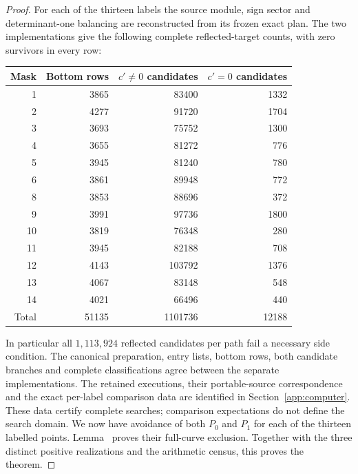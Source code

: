 \begin{proof}
For each of the thirteen labels the source module, sign sector and
determinant-one balancing are reconstructed from its frozen exact plan.
The two implementations give the following complete reflected-target
counts, with zero survivors in every row:
\begin{center}
\begin{tabular}{rrrr}
\toprule
Mask & Bottom rows & $c'\ne0$ candidates & $c'=0$ candidates\\
\midrule
1 & 3865 & 83400 & 1332\\
2 & 4277 & 91720 & 1704\\
3 & 3693 & 75752 & 1300\\
4 & 3655 & 81272 & 776\\
5 & 3945 & 81240 & 780\\
6 & 3861 & 89948 & 772\\
8 & 3853 & 88696 & 372\\
9 & 3991 & 97736 & 1800\\
10 & 3819 & 76348 & 280\\
11 & 3945 & 82188 & 708\\
12 & 4143 & 103792 & 1376\\
13 & 4067 & 83148 & 548\\
14 & 4021 & 66496 & 440\\
\midrule
Total & 51135 & 1101736 & 12188\\
\bottomrule
\end{tabular}
\end{center}
In particular all $1{,}113{,}924$ reflected candidates per path fail a
necessary side condition. The canonical preparation, entry lists,
bottom rows, both candidate branches and complete classifications agree
between the separate implementations. The retained executions, their
portable-source correspondence and the exact per-label comparison data
are identified in Section~\ref{app:computer}. These data certify
complete searches; comparison expectations do not define the search
domain. We now have avoidance of both $P_0$ and $P_1$ for each of the
thirteen labelled points. Lemma~ proves their
full-curve exclusion. Together with the three distinct positive
realizations and the arithmetic census, this proves the theorem.
\end{proof}

